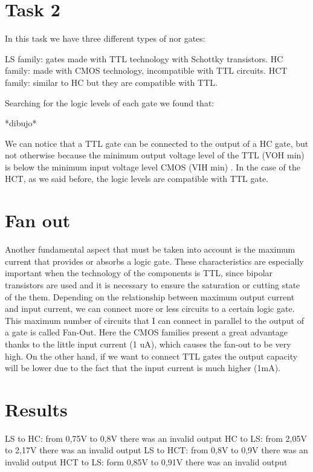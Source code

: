 \newpage
\section*{Task 2}

    In this task we have three different types of nor gates:

LS family: gates made with TTL technology with Schottky transistors.
HC family: made with CMOS technology, incompatible with TTL circuits.
HCT family: similar to HC but they are compatible with TTL.

Searching for the logic levels of each gate we found that:

*dibujo*

We can notice that a TTL gate can be connected to the output of a HC gate, but not  otherwise because the minimum output voltage level of the TTL (VOH min) is below the minimum input voltage level CMOS (VIH min) .
In the case of the HCT, as we said before, the logic levels are compatible with TTL gate. 

\section*{Fan out}

Another fundamental aspect that must be taken into account is the maximum current that
provides or absorbs a logic gate. These characteristics are especially
important when the technology of the components is TTL, since bipolar transistors are used and it is necessary to ensure the saturation or cutting state of the
them. Depending on the relationship between maximum output current and
input current, we can connect more or less circuits to a certain logic gate. This maximum number of circuits that I can connect in parallel to the output of a gate is called Fan-Out.
Here the CMOS families present a great advantage thanks to the little
input current (1 uA), which causes the fan-out to be very high. 
On the other hand, if we want to connect TTL gates 
the output capacity will be lower due to the fact that the input current is much higher (1mA).



\section*{Results}

LS to HC: from 0,75V to 0,8V there was an invalid output
\newline
HC to LS: from 2,05V to 2,17V there was an invalid output
\newline
LS to HCT: from 0,8V to 0,9V there was an invalid output
\newline
HCT to LS: form 0,85V to 0,91V there was an invalid output
\newline


